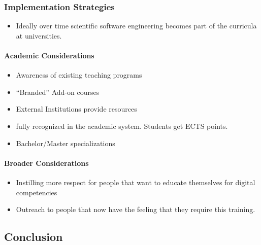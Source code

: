 \documentclass[a4paper
]{article}
\providecommand{\tightlist}{%
  \setlength{\itemsep}{0pt}\setlength{\parskip}{0pt}}
\begin{document}
\hypertarget{implementation-strategies}{%
\subsubsection{Implementation
Strategies}\label{implementation-strategies}}

\begin{itemize}
\tightlist
\item
  Ideally over time scientific software engineering becomes part of the
  curricula at universities.
\end{itemize}

\hypertarget{academic-considerations}{%
\paragraph{Academic Considerations}\label{academic-considerations}}

\begin{itemize}
\tightlist
\item
  Awareness of existing teaching programs
\item
  ``Branded'' Add-on courses
\item
  External Institutions provide resources
\item
  fully recognized in the academic system. Students get ECTS points.
\item
  Bachelor/Master specializations
\end{itemize}

\hypertarget{broader-considerations}{%
\paragraph{Broader Considerations}\label{broader-considerations}}

\begin{itemize}
\tightlist
\item
  Instilling more respect for people that want to educate themselves for
  digital competencies
\item
  Outreach to people that now have the feeling that they require this
  training.
\end{itemize}

\hypertarget{conclusion}{%
\subsection{Conclusion}\label{conclusion}}
\end{document}
